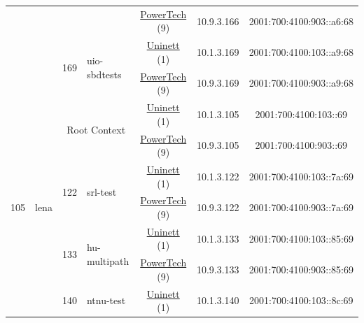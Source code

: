 \begin{small}
\begin{center}
\begin{longtable}{|c|c|c|c|c|c|c|c|}
  &  &  &  & \multicolumn{2}{|c|}{\tiny{\href{http://www.powertech.no}{PowerTech} (9)}} & \tiny{10.9.3.166} & \tiny{2001:700:4100:903::a6:68} \\* \cline{3-3}\cline{4-4}\cline{5-5}\cline{6-6}\cline{7-7}\cline{8-8}
  &  & \multirow{2}{*}{\tiny{169}} & \multicolumn{1}{|l|}{\multirow{2}{*}{\tiny{uio-sbdtests}}} & \multicolumn{2}{|c|}{\tiny{\href{https://www.uninett.no}{Uninett} (1)}} & \tiny{10.1.3.169} & \tiny{2001:700:4100:103::a9:68} \\* \cline{5-5}\cline{6-6}\cline{7-7}\cline{8-8}
  &  &  &  & \multicolumn{2}{|c|}{\tiny{\href{http://www.powertech.no}{PowerTech} (9)}} & \tiny{10.9.3.169} & \tiny{2001:700:4100:903::a9:68} \\ \hline
 \multirow{16}{*}{\tiny{105}} & \multicolumn{1}{|l|}{\multirow{16}{*}{\tiny{lena}}} & \multicolumn{2}{|c|}{\multirow{2}{*}{\tiny{Root Context}}} & \multicolumn{2}{|c|}{\tiny{\href{https://www.uninett.no}{Uninett} (1)}} & \tiny{10.1.3.105} & \tiny{2001:700:4100:103::69} \\* \cline{5-5}\cline{6-6}\cline{7-7}\cline{8-8}
  &  & \multicolumn{2}{|c|}{} & \multicolumn{2}{|c|}{\tiny{\href{http://www.powertech.no}{PowerTech} (9)}} & \tiny{10.9.3.105} & \tiny{2001:700:4100:903::69} \\* \cline{3-3}\cline{4-4}\cline{5-5}\cline{6-6}\cline{7-7}\cline{8-8}
  &  & \multirow{2}{*}{\tiny{122}} & \multicolumn{1}{|l|}{\multirow{2}{*}{\tiny{srl-test}}} & \multicolumn{2}{|c|}{\tiny{\href{https://www.uninett.no}{Uninett} (1)}} & \tiny{10.1.3.122} & \tiny{2001:700:4100:103::7a:69} \\* \cline{5-5}\cline{6-6}\cline{7-7}\cline{8-8}
  &  &  &  & \multicolumn{2}{|c|}{\tiny{\href{http://www.powertech.no}{PowerTech} (9)}} & \tiny{10.9.3.122} & \tiny{2001:700:4100:903::7a:69} \\* \cline{3-3}\cline{4-4}\cline{5-5}\cline{6-6}\cline{7-7}\cline{8-8}
  &  & \multirow{2}{*}{\tiny{133}} & \multicolumn{1}{|l|}{\multirow{2}{*}{\tiny{hu-multipath}}} & \multicolumn{2}{|c|}{\tiny{\href{https://www.uninett.no}{Uninett} (1)}} & \tiny{10.1.3.133} & \tiny{2001:700:4100:103::85:69} \\* \cline{5-5}\cline{6-6}\cline{7-7}\cline{8-8}
  &  &  &  & \multicolumn{2}{|c|}{\tiny{\href{http://www.powertech.no}{PowerTech} (9)}} & \tiny{10.9.3.133} & \tiny{2001:700:4100:903::85:69} \\* \cline{3-3}\cline{4-4}\cline{5-5}\cline{6-6}\cline{7-7}\cline{8-8}
  &  & \multirow{2}{*}{\tiny{140}} & \multicolumn{1}{|l|}{\multirow{2}{*}{\tiny{ntnu-test}}} & \multicolumn{2}{|c|}{\tiny{\href{https://www.uninett.no}{Uninett} (1)}} & \tiny{10.1.3.140} & \tiny{2001:700:4100:103::8c:69} \\* \cline{5-5}\cline{6-6}\cline{7-7}\cline{8-8}

\end{longtable}
\end{center}
\end{small}
